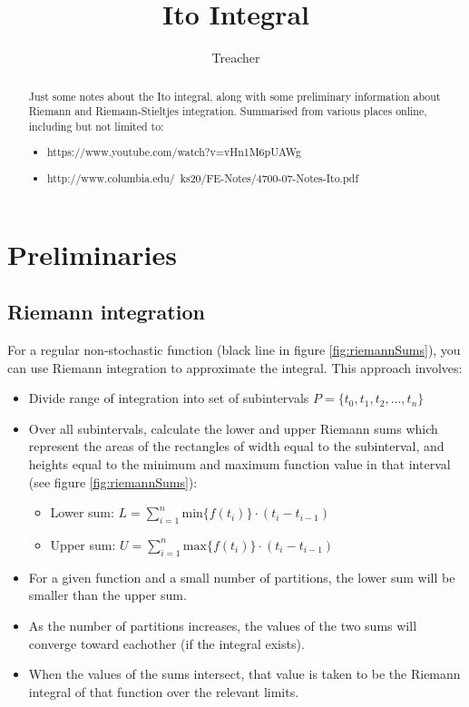 \documentclass[12pt]{article}
\title{Ito Integral}
\author{Treacher}
\begin{document}
\date{}
\maketitle

\begin{abstract}

\noindent Just some notes about the Ito integral, along with some preliminary information about Riemann and Riemann-Stieltjes integration. Summarised from various places online, including but not limited to:
\begin{itemize}
	\item https://www.youtube.com/watch?v=vHn1M6pUAWg
	\item http://www.columbia.edu/~ks20/FE-Notes/4700-07-Notes-Ito.pdf
\end{itemize}

\end{abstract}

\section{Preliminaries}
\subsection{Riemann integration}
For a regular non-stochastic function (black line in figure \ref{fig:riemannSums}), you can use Riemann integration to approximate the integral. This approach involves:
\begin{itemize}
	\item Divide range of integration into set of subintervals $P=\{t_0,t_1,t_2,...,t_n\}$
	\item Over all subintervals, calculate the lower and upper Riemann sums which represent the areas of the rectangles of width equal to the subinterval, and heights equal to the minimum and maximum function value in that interval (see figure \ref{fig:riemannSums}):
	\begin{itemize}
		\item Lower sum: $L = \sum_{i=1}^{n}\mathrm{min}\{f(t_i)\}\cdot(t_i-t_{i-1})$
		\item Upper sum: $U = \sum_{i=1}^{n}\mathrm{max}\{f(t_i)\}\cdot(t_i-t_{i-1})$
	\end{itemize}
	\item For a given function and a small number of partitions, the lower sum will be smaller than the upper sum.
	\item As the number of partitions increases, the values of the two sums will converge toward eachother (if the integral exists).
	\item When the values of the sums intersect, that value is taken to be the Riemann integral of that function over the relevant limits.
\end{itemize}
\end{document}

